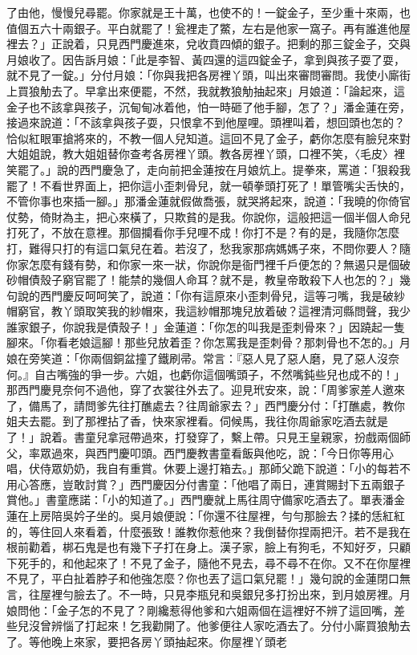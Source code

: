 \begin{showcontents}{}
了由他，慢慢兒尋罷。你家就是王十萬，也使不的！一錠金子，至少重十來兩，也值個五六十兩銀子。平白就罷了！瓮裡走了鱉，左右是他家一窩子。再有誰進他屋裡去？」正說着，只見西門慶進來，兌收賁四傾的銀子。把剩的那三錠金子，交與月娘收了。因告訴月娘：「此是李智、黃四還的這四錠金子，拿到與孩子耍了耍，就不見了一錠。」分付月娘：「你與我把各房裡丫頭，叫出來審問審問。我使小廝街上買狼觔去了。早拿出來便罷，不然，我就教狼觔抽起來」月娘道：「論起來，這金子也不該拿與孩子，沉甸甸冰着他，怕一時砸了他手腳，怎了？」潘金蓮在旁，接過來說道：「不該拿與孩子耍，只恨拿不到他屋哩。頭裡叫着，想回頭也怎的？恰似紅眼軍搶將來的，不教一個人兒知道。這回不見了金子，虧你怎麼有臉兒來對大姐姐說，教大姐姐替你查考各房裡丫頭。教各房裡丫頭，口裡不笑，〈毛皮〉裡笑罷了。」說的西門慶急了，走向前把金蓮按在月娘炕上。提拳來，罵道：「狠殺我罷了！不看世界面上，把你這小歪刺骨兒，就一頓拳頭打死了！單管嘴尖舌快的，不管你事也來插一腳。」那潘金蓮就假做喬張，就哭將起來，說道：「我曉的你倚官仗勢，倚財為主，把心來橫了，只欺貧的是我。你說你，這般把這一個半個人命兒打死了，不放在意裡。那個攔看你手兒哩不成！你打不是？有的是，我隨你怎麼打，難得只打的有這口氣兒在着。若沒了，愁我家那病媽媽子來，不問你要人？隨你家怎麼有錢有勢，和你家一來一狀，你說你是衙門裡千戶便怎的？無遏只是個破砂帽債殼子窮官罷了！能禁的幾個人命耳？就不是，教皇帝敢殺下人也怎的？」幾句說的西門慶反呵呵笑了，說道：「你有這原來小歪刺骨兒，這等刁嘴，我是破紗帽窮官，教丫頭取笑我的紗帽來，我這紗帽那塊兒放着破？這裡清河縣問聲，我少誰家銀子，你說我是債殼子！」金蓮道：「你怎的叫我是歪刺骨來？」因蹺起一隻腳來。「你看老娘這腳！那些兒放着歪？你怎罵我是歪刺骨？那刺骨也不怎的。」月娘在旁笑道：「你兩個銅盆撞了鐵刷帚。常言：『惡人見了惡人磨，見了惡人沒奈何。』自古嘴強的爭一步。六姐，也虧你這個嘴頭子，不然嘴鈍些兒也成不的！」那西門慶見奈何不過他，穿了衣裳往外去了。迎見玳安來，說：「周爹家差人邀來了，備馬了，請問爹先往打醮處去？往周爺家去？」西門慶分付：「打醮處，教你姐夫去罷。到了那裡拈了香，快來家裡看。伺候馬，我往你周爺家吃酒去就是了！」說着。書童兒拿冠帶過來，打發穿了，繫上帶。只見王皇親家，扮戲兩個師父，率眾過來，與西門慶叩頭。西門慶教書童看飯與他吃，說：「今日你等用心唱，伏侍眾奶奶，我自有重賞。休要上邊打箱去。」那師父跪下說道：「小的每若不用心答應，豈敢討賞？」西門慶因分付書童：「他唱了兩日，連賞賜封下五兩銀子賞他。」書童應諾：「小的知道了。」西門慶就上馬往周守備家吃酒去了。單表潘金蓮在上房陪吳妗子坐的。吳月娘便說：「你還不往屋裡，勻勻那臉去？揉的恁紅紅的，等住回人來看着，什麼張致！誰教你惹他來？我倒替你捏兩把汗。若不是我在根前勸着，梆石鬼是也有幾下子打在身上。漢子家，臉上有狗毛，不知好歹，只顧下死手的，和他起來了！不見了金子，隨他不見去，尋不尋不在你。又不在你屋裡不見了，平白扯着脖子和他強怎麼？你也丟了這口氣兒罷！」幾句說的金蓮閉口無言，往屋裡勻臉去了。不一時，只見李瓶兒和吳銀兒多打扮出來，到月娘房裡。月娘問他：「金子怎的不見了？剛纔惹得他爹和六姐兩個在這裡好不辨了這回嘴，差些兒沒曾辨惱了打起來！乞我勸開了。他爹便往人家吃酒去了。分付小廝買狼觔去了。等他晚上來家，要把各房丫頭抽起來。你屋裡丫頭老
\end{showcontents}
